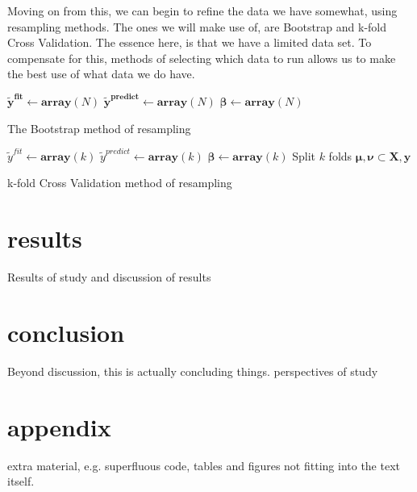 \documentclass[12pt]{revtex4-2}
\begin{document}
Moving on from this, we can begin to refine the data we have somewhat, using resampling 
methods. The ones we will make use of, are Bootstrap and k-fold Cross Validation. 
The essence here, is that we have a limited data set. To compensate for this, methods of
selecting which data to run allows us to make the best use of what data we do have. 

\begin{algorithm}
	\DontPrintSemicolon
	$\bm{\tilde{y}^{fit}} \gets \mathbf{array}(N)$\;
	$\bm{\tilde{y}^{predict}} \gets \mathbf{array}(N)$\;
	$\bm{\beta} \gets \mathbf{array}(N)$\;
	\caption{The Bootstrap method of resampling}
	\label{alg:bootstrap}
\end{algorithm}

\begin{algorithm}
	\DontPrintSemicolon
	$\tilde{y}^{fit} \gets \mathbf{array}(k)$\;
	$\tilde{y}^{predict} \gets \mathbf{array}(k)$\;
	$\bm{\beta} \gets \mathbf{array}(k)$\;
	Split $k$ folds $\bm{\mu}, \bm{\nu} \subset \bm{X}, \bm{y}$\;
	\caption{k-fold Cross Validation method of resampling}
	\label{alf:kfoldCV}
\end{algorithm}

\section{results}
Results of study and discussion of results
\section{conclusion}
Beyond discussion, this is actually concluding things. 
perspectives of study
\section{appendix}
extra material, e.g. superfluous code, tables and figures not fitting into the text itself.

\end{document}
